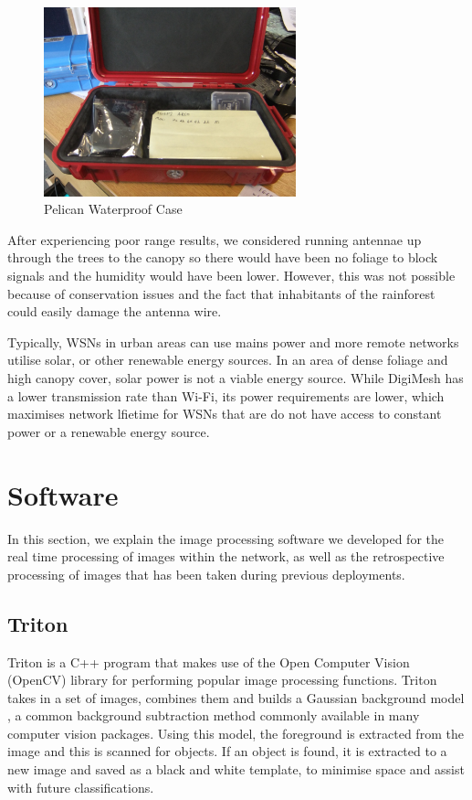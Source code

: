 			\begin{figure}[h]
			\centering
			\includegraphics[width=0.65\textwidth]{Chap3/figures/pelican}
			\caption{Pelican Waterproof Case}
			\label{fig:tech:pelican}
			\end{figure}

	After experiencing poor range results, we considered running antennae up through the trees to the canopy so there would have been no foliage to block signals and the humidity would have been lower. However, this was not possible because of conservation issues and the fact that inhabitants of the rainforest could easily damage the antenna wire.

	Typically, WSNs in urban areas can use mains power and more remote networks utilise solar, or other renewable energy sources. In an area of dense foliage and high canopy cover, solar power is not a viable energy source. While DigiMesh has a lower transmission rate than Wi-Fi, its power requirements are lower, which maximises network lfietime for WSNs that are do not have access to constant power or a renewable energy source.

\section{Software}\label{tech:sw}
	In this section, we explain the image processing software we developed for the real time processing of images within the network, as well as the retrospective processing of images that has been taken during previous deployments.

	\subsection{Triton} \label{tech:sf:triton}
		Triton is a C++ program that makes use of the Open Computer Vision (OpenCV) library for performing popular image processing functions. Triton takes in a set of images, combines them and builds a Gaussian background model \cite{Zivkovic2004}, a common background subtraction method commonly available in many computer vision packages. Using this model, the foreground is extracted from the image and this is scanned for objects. If an object is found, it is extracted to a new image and saved as a black and white template, to minimise space and assist with future classifications.
		
